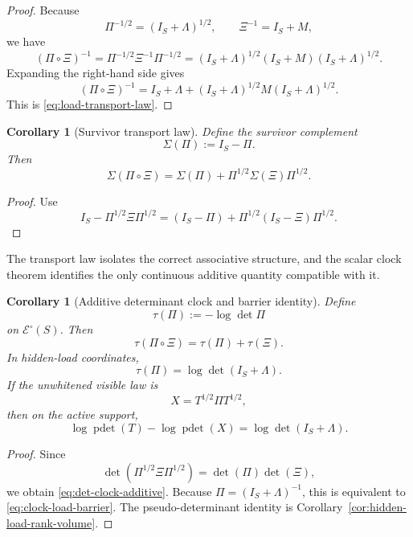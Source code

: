 \documentclass[11pt]{article}
\numberwithin{equation}{section}
\DeclareMathOperator{\pdet}{pdet}
\theoremstyle{thmcompact}
\newtheorem{corollary}[theorem]{Corollary}
\theoremstyle{remark}
\begin{document}
\begin{proof}
Because
\[
\Pi^{-1/2}=(I_S+\Lambda)^{1/2},
\qquad
\Xi^{-1}=I_S+M,
\]
we have
\[
(\Pi\circ\Xi)^{-1}
=
\Pi^{-1/2}\Xi^{-1}\Pi^{-1/2}
=
(I_S+\Lambda)^{1/2}(I_S+M)(I_S+\Lambda)^{1/2}.
\]
Expanding the right-hand side gives
\[
(\Pi\circ\Xi)^{-1}
=
I_S + \Lambda + (I_S+\Lambda)^{1/2} M (I_S+\Lambda)^{1/2}.
\]
This is \eqref{eq:load-transport-law}.
\end{proof}

\begin{corollary}[Survivor transport law]\label{cor:survivor-transport}
Define the survivor complement
\[
\Sigma(\Pi):=I_S-\Pi.
\]
Then
\begin{equation}\label{eq:survivor-transport}
\Sigma(\Pi\circ\Xi)
=
\Sigma(\Pi)+\Pi^{1/2}\Sigma(\Xi)\Pi^{1/2}.
\end{equation}
\end{corollary}

\begin{proof}
Use
\[
I_S-\Pi^{1/2}\Xi\Pi^{1/2}
=
(I_S-\Pi)+\Pi^{1/2}(I_S-\Xi)\Pi^{1/2}.
\]
\end{proof}

The transport law isolates the correct associative structure, and the scalar clock theorem identifies the only continuous additive quantity compatible with it.

\begin{corollary}[Additive determinant clock and barrier identity]\label{cor:det-clock}
Define
\begin{equation}\label{eq:det-clock}
\tau(\Pi):=-\log\det\Pi
\end{equation}
on $\mathcal E^\circ(S)$. Then
\begin{equation}\label{eq:det-clock-additive}
\tau(\Pi\circ\Xi)=\tau(\Pi)+\tau(\Xi).
\end{equation}
In hidden-load coordinates,
\begin{equation}\label{eq:clock-load-barrier}
\tau(\Pi)=\log\det(I_S+\Lambda).
\end{equation}
If the unwhitened visible law is
\[
X=T^{1/2}\Pi T^{1/2},
\]
then on the active support,
\begin{equation}\label{eq:pdet-barrier}
\log\pdet(T)-\log\pdet(X)=\log\det(I_S+\Lambda).
\end{equation}
\end{corollary}

\begin{proof}
Since
\[
\det(\Pi^{1/2}\Xi\Pi^{1/2})=\det(\Pi)\det(\Xi),
\]
we obtain \eqref{eq:det-clock-additive}. Because $\Pi=(I_S+\Lambda)^{-1}$, this is equivalent to \eqref{eq:clock-load-barrier}. The pseudo-determinant identity is Corollary~\ref{cor:hidden-load-rank-volume}.
\end{proof}
\end{document}
